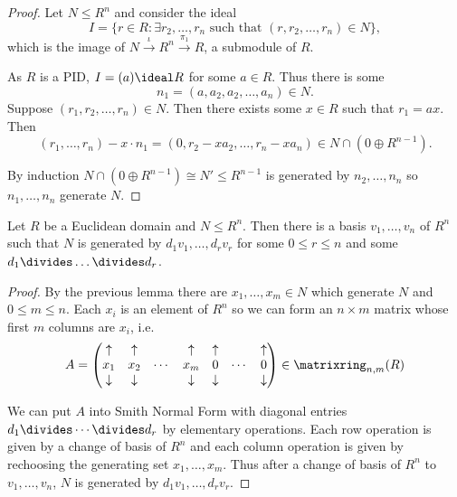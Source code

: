 \documentclass[a4paper]{article}
\begin{document}
\begin{proof}
  Let \(N \leq R^n\) and consider the ideal
  \[
    I = \{r \in R: \exists r_2, \dots, r_n \text{ such that } (r, r_2, \dots, r_n) \in N\},
  \]
  which is the image of \(N \stackrel{\iota}{\to} R^n \stackrel{\pi_1}{\to} R\), a submodule of \(R\).

    As \(R\) is a PID, \(I = (a) \ideal R\) for some \(a \in R\). Thus there is some
    \[
      n_1 = (a, a_2, a_2, \dots, a_n) \in N.
    \]
    Suppose \((r_1, r_2, \dots, r_n) \in N\). Then there exists some \(x \in R\) such that \(r_1 = ax\). Then
    \[
      (r_1, \dots, r_n) - x \cdot n_1 = (0, r_2 - xa_2, \dots, r_n - xa_n) \in N \cap (0 \oplus R^{n-1}).
    \]

    By induction \(N \cap (0 \oplus R^{n - 1}) \cong N' \leq R^{n - 1}\) is generated by \(n_2, \dots, n_n\) so \(n_1, \dots, n_n\) generate \(N\).
\end{proof}

\begin{theorem}
  Let \(R\) be a Euclidean domain and \(N \leq R^n\). Then there is a basis \(v_1, \dots, v_n\) of \(R^n\) such that \(N\) is generated by \(d_1v_1, \dots, d_rv_r\) for some \(0 \leq r \leq n\) and some \(d_1 \divides \dots \divides d_r\).
\end{theorem}

\begin{proof}
  By the previous lemma there are \(x_1, \dots, x_m \in N\) which generate \(N\) and \(0 \leq m \leq n\). Each \(x_i\) is an element of \(R^n\) so we can form an \(n \times m\) matrix whose first \(m\) columns are \(x_i\), i.e.
  \[
    A =
    \begin{pmatrix}
      \uparrow & \uparrow & & \uparrow & \uparrow & & \uparrow \\
      x_1 & x_2 & \cdots & x_m & 0 & \cdots & 0 \\
      \downarrow & \downarrow & & \downarrow & \downarrow & & \downarrow \\
    \end{pmatrix}
    \in \matrixring_{n, m}(R)
  \]

  We can put \(A\) into Smith Normal Form with diagonal entries \(d_1 \divides \cdots \divides d_r\) by elementary operations. Each row operation is given by a change of basis of \(R^n\) and each column operation is given by rechoosing the generating set \(x_1, \dots, x_m\). Thus after a change of basis of \(R^n\) to \(v_1, \dots, v_n\), \(N\) is generated by \(d_1v_1, \dots, d_rv_r\).
\end{proof}
\end{document}
